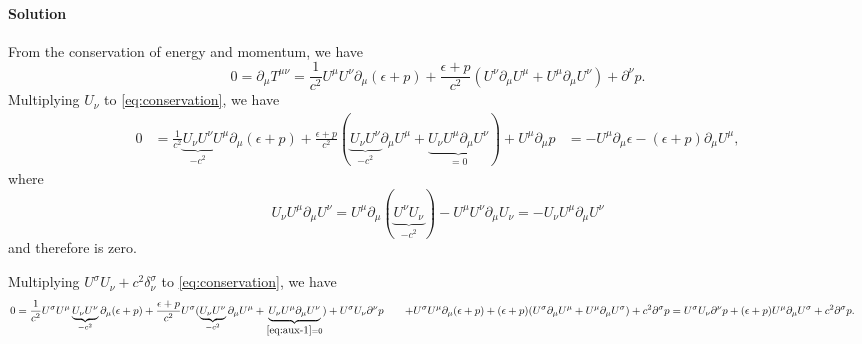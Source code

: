 \documentclass[hyperref, a4paper]{article}
\def\\{}%
\begin{document}
\paragraph{Solution} From the conservation of energy and momentum, we have 
\begin{equation}
    0 = \partial_\mu T^{\mu \nu} = \frac{1}{c^2} U^\mu U^\nu \partial_\mu(\epsilon + p) + \frac{\epsilon + p}{c^2} (U^\nu \partial_\mu U^\mu + U^\mu \partial_\mu U^\nu) + \partial^\nu p.
    \label{eq:conservation}
\end{equation}
Multiplying $U_\nu$ to \eqref{eq:conservation}, we have 
\begin{equation}
    \begin{aligned}
        0 &= \frac{1}{c^2} \underbrace{U_\nu U^\nu}_{- c^2} U^\mu \partial_\mu (\epsilon + p) 
        + \frac{\epsilon + p}{c^2} ( \underbrace{U_\nu U^\nu}_{-c^2} \partial_\mu U^\mu + \underbrace{U_\nu U^\mu \partial_\mu U^\nu}_{=0} ) + U^\mu \partial_\mu p \\
        &= - U^\mu \partial_\mu \epsilon - (\epsilon + p) \partial_\mu U^\mu ,
    \end{aligned}
\end{equation}
where 
\begin{equation}
    U_\nu U^\mu \partial_\mu U^\nu = U^\mu \partial_\mu ( \underbrace{U^\nu U_\nu}_{-c^2} ) - U^\mu U^\nu \partial_\mu U_\nu = - U_\nu U^\mu \partial_\mu U^\nu 
    \label{eq:aux-1}
\end{equation}
and therefore is zero. 

Multiplying $U^\sigma U_\nu + c^2 \delta^\sigma_\nu$ to \eqref{eq:conservation},
we have 
\begin{equation}
    \begin{aligned}
        0 &= \frac{1}{c^2} U^\sigma U^\mu \underbrace{U_\nu U^\nu}_{- c^2} \partial_\mu(\epsilon + p) + \frac{\epsilon + p}{c^2} U^\sigma ( \underbrace{U_\nu U^\nu}_{-c^2} \partial_\mu U^\mu + \underbrace{U_\nu U^\mu \partial_\mu U^\nu}_{\eqref{eq:aux-1} = 0}) + U^\sigma U_\nu \partial^\nu p  \\
        &\quad + U^\sigma U^\mu \partial_\mu (\epsilon + p) + (\epsilon + p) (U^\sigma \partial_\mu U^\mu + U^\mu \partial_\mu U^\sigma) + c^2 \partial^\sigma p \\
        &= U^\sigma U_\nu \partial^\nu p + (\epsilon + p) U^\mu \partial_\mu U^\sigma + c^2 \partial^\sigma p.
    \end{aligned}
\end{equation}
\end{document}
